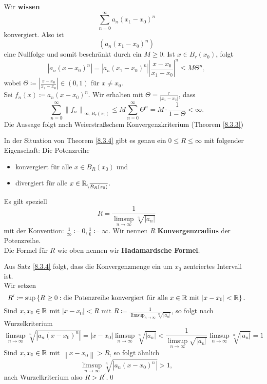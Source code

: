 \begin{subproof*}
	Wir \textbf{wissen}
	\[
		\sum_{n=0}^{\infty} a_n(x_1-x_0)^n
	\]
	konvergiert. Also ist
	\[
		(a_n(x_1-x_0)^n)
	\]
	eine Nullfolge und somit beschränkt durch ein $ M \geq 0 $.
	Ist $ x \in B_{r}(x_0)  $, folgt
	\[
		\left| a_n(x-x_0)^n \right| = \left| a_n(x_1-x_0)^n \right| \left| \frac{ x - x_0 }{ x_1 - x_0 }  \right|^n \leq  M\Theta^n,
	\]
	wobei $ \Theta \coloneqq \left| \frac{ x - x_0 }{ x_1 - x_0 }  \right| \in (0, 1) $ für $ x \neq x_0 $.\\
	Sei $ f_n(x) \coloneqq a_n(x - x_0)^n $. Wir erhalten mit $ \Theta = \frac{ r }{ \left| x_1 - x_0 \right|  }  $, dass
	\[
		\sum_{n=0}^{\infty} \left\| f_n \right\|_{\infty, B_{r}(x_0) } \leq  M \sum_{n=0}^{\infty} \Theta^n = M \cdot \frac{ 1 }{ 1 - \Theta } < \infty.
	\]
	Die Aussage folgt nach Weierstraßschem Konvergenzkriterium (Theorem \ref{8.3.3})
\end{subproof*}

\begin{subcorollary}
	In der Situation von Theorem \ref{8.3.4} gibt es genau ein $ 0 \leq R \leq \infty $ mit folgender Eigenschaft: Die Potenzreihe
	\begin{itemize}
		\item konvergiert für alle $ x \in B_{R}(x_0)  $ und
		\item divergiert für alle $ x \in \mathbb{R}_{\setminus \overline{B_{R}(x_0) }} $.
	\end{itemize}
	Es gilt speziell
	\[
		R = \frac{ 1 }{ \limsup_{n \to \infty} \sqrt[n]{\left| a_n \right|}  } 
	\]
	mit der Konvention: $ \frac{ 1 }{ \infty } \coloneqq 0, \frac{ 1 }{ 0 } \coloneqq \infty $. Wir nennen $ R $ \textbf{Konvergenzradius} der Potenzreihe.\\
	Die Formel für $ R $ wie oben nennen wir \textbf{Hadamardsche Formel}.
\end{subcorollary}

\begin{subproof*}
	Aus Satz \ref{8.3.4} folgt, dass die Konvergenzmenge ein um $ x_0 $ zentriertes Intervall ist.\\
	Wir setzen
	\[
		R^\prime \coloneqq \sup \left\{ R \geq 0: \text{die Potenzreihe konvergiert für alle $ x \in \mathbb{R}  $ mit $ \left| x - x_0 \right| < \mathbb{R}  $}  \right\} .
	\]
	Sind $ x, x_0 \in \mathbb{R}  $ mit $ \left| x - x_0 \right| < R $ mit $ R \coloneqq \frac{ 1 }{ \limsup_{n \to \infty} \sqrt[n]{\left| a_n \right| } }  $, so folgt nach Wurzelkriterium
	\[
		\limsup_{n \to \infty} \sqrt[n]{|a_n(x - x_0)^n|} = \left| x - x_0 \right| \limsup_{n \to \infty} \sqrt[n]{\left| a_n \right| } < \frac{ 1 }{ \limsup_{n \to \infty} \sqrt{\left| a_n \right| } } \limsup_{n \to \infty} \sqrt[n]{\left| a_n \right| } = 1
	\]
	Sind $ x, x_0 \in \mathbb{R}  $ mit $ \left\| x - x_0 \right\| > R $, so folgt ähnlich
	\[
		\limsup_{n \to \infty} \sqrt[n]{\left| a_n(x - x_0)^n \right| } > 1,
	\]
	nach Wurzelkriterium also $ R > R^\prime $.\qed
\end{subproof*}


